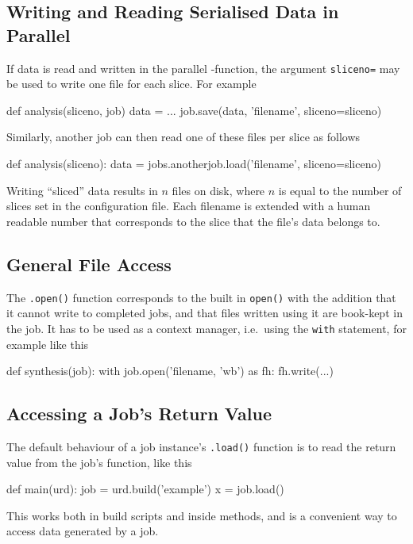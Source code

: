 \subsection{Writing and Reading Serialised Data in Parallel}
\label{sec:sliced_files}
If data is read and written in the parallel \analysis-function, the
argument \texttt{sliceno=} may be used to write one file for each
slice.  For example
\begin{python}
def analysis(sliceno, job)
    data = ...
    job.save(data, 'filename', sliceno=sliceno)
\end{python}
Similarly, another job can then read one of these files per slice as follows
\begin{python}

def analysis(sliceno):
    data = jobs.anotherjob.load('filename', sliceno=sliceno)
\end{python}
Writing ``sliced'' data results in $n$ files on disk, where $n$ is
equal to the number of slices set in the configuration file.  Each
filename is extended with a human readable number that corresponds to
the slice that the file's data belongs to.



\subsection{General File Access}
The \texttt{.open()} function corresponds to the built in
\texttt{open()} with the addition that it cannot write to completed
jobs, and that files written using it are book-kept in the job.  It
has to be used as a context manager, i.e.\ using the \texttt{with}
statement, for example like this
\begin{python}
def synthesis(job):
    with job.open('filename, 'wb') as fh:
        fh.write(...)
\end{python}


\subsection{Accessing a Job's Return Value}
The default behaviour of a job instance's \texttt{.load()} function is
to read the return value from the job's \synthesis function, like this
\begin{python}
def main(urd):
    job = urd.build('example')
    x = job.load()
\end{python}
This works both in build scripts and inside methods, and is a
convenient way to access data generated by a job.


